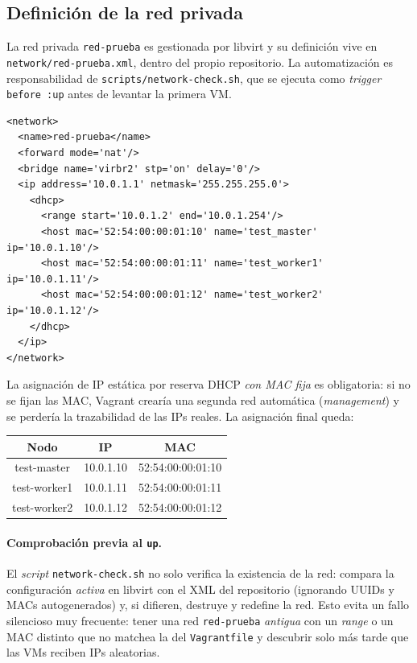 \subsection{Definición de la red privada}

La red privada \texttt{red-prueba} es gestionada por libvirt y su definición vive en \texttt{network/red-prueba.xml}, dentro del propio repositorio. La automatización es responsabilidad de \texttt{scripts/network-check.sh}, que se ejecuta como \emph{trigger} \texttt{before :up} antes de levantar la primera VM.

\begin{lstlisting}[style=xml]
<network>
  <name>red-prueba</name>
  <forward mode='nat'/>
  <bridge name='virbr2' stp='on' delay='0'/>
  <ip address='10.0.1.1' netmask='255.255.255.0'>
    <dhcp>
      <range start='10.0.1.2' end='10.0.1.254'/>
      <host mac='52:54:00:00:01:10' name='test_master'  ip='10.0.1.10'/>
      <host mac='52:54:00:00:01:11' name='test_worker1' ip='10.0.1.11'/>
      <host mac='52:54:00:00:01:12' name='test_worker2' ip='10.0.1.12'/>
    </dhcp>
  </ip>
</network>
\end{lstlisting}

La asignación de IP estática por reserva DHCP \emph{con MAC fija} es obligatoria: si no se fijan las MAC, Vagrant crearía una segunda red automática (\emph{management}) y se perdería la trazabilidad de las IPs reales. La asignación final queda:

\begin{center}
  \begin{tabular}{|c|c|c|}
    \hline
    Nodo & IP & MAC \\
    \hline
    test-master  & 10.0.1.10 & 52:54:00:00:01:10 \\
    test-worker1 & 10.0.1.11 & 52:54:00:00:01:11 \\
    test-worker2 & 10.0.1.12 & 52:54:00:00:01:12 \\
    \hline
  \end{tabular}
\end{center}

\paragraph{Comprobación previa al \texttt{up}.} El \emph{script} \texttt{network-check.sh} no solo verifica la existencia de la red: compara la configuración \emph{activa} en libvirt con el XML del repositorio (ignorando UUIDs y MACs autogenerados) y, si difieren, destruye y redefine la red. Esto evita un fallo silencioso muy frecuente: tener una red \texttt{red-prueba} \emph{antigua} con un \emph{range} o un MAC distinto que no matchea la del \texttt{Vagrantfile} y descubrir solo más tarde que las VMs reciben IPs aleatorias.

